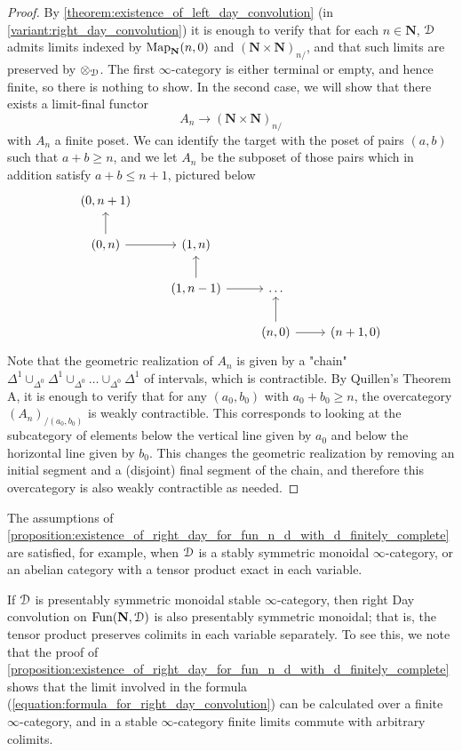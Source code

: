 \documentclass[oneside,a4paper]{amsart}
\begin{document}
\begin{proof}
By \cref{theorem:existence_of_left_day_convolution} (in \cref{variant:right_day_convolution}) it is enough to verify that for each $n \in \mathbf{N}$, $\EuScript{D}$ admits limits indexed by $\mathrm{Map}_{\mathbf{N}}(n, 0)$ and $(\mathbf{N} \times \mathbf{N})_{n / }$, and that such limits are preserved by $\otimes_{\EuScript{D}}$. The first $\infty$-category is either terminal or empty, and hence finite, so there is nothing to show. In the second case, we will show that there exists a limit-final functor 
\[
A_{n} \rightarrow (\mathbf{N} \times \mathbf{N})_{n / }
\]
with $A_{n}$ a finite poset. We can identify the target with the poset of pairs $(a, b)$ such that $a+b \geq n$, and we let $A_{n}$ be the subposet of those pairs which in addition satisfy $a+b \leq n+1$, pictured below 
\[
\begin{tikzcd}
	{(0, n+1)} &&& \\
	{(0, n)} & {(1, n)} \\
	& {(1, n-1)} & \ldots \\
	&& {(n, 0)} & {(n+1, 0)}
	\arrow[from=2-1, to=1-1]
	\arrow[from=2-1, to=2-2]
	\arrow[from=3-2, to=2-2]
	\arrow[from=3-2, to=3-3]
	\arrow[from=4-3, to=3-3]
	\arrow[from=4-3, to=4-4]
\end{tikzcd}
\]
Note that the geometric realization of $A_{n}$ is given by a "chain" $\Delta^{1} \cup_{\Delta^{0}} \Delta^{1} \cup_{\Delta^{0}} \ldots \cup_{\Delta^{0}} \Delta^{1}$ of intervals, which is contractible. By Quillen's Theorem A, it is enough to verify that for any $(a_{0}, b_{0})$ with $a_{0} + b_{0} \geq n$, the overcategory $(A_{n})_{/ (a_{0}, b_{0})}$ is weakly contractible. This corresponds to looking at the subcategory of elements below the vertical line given by $a_{0}$ and below the horizontal line given by $b_{0}$. This changes the geometric realization by removing an initial segment and a (disjoint) final segment of the chain, and therefore this overcategory is also weakly contractible as needed.  
\end{proof}

\begin{example}
The assumptions of \cref{proposition:existence_of_right_day_for_fun_n_d_with_d_finitely_complete} are satisfied, for example, when $\EuScript{D}$ is a stably symmetric monoidal $\infty$-category, or an abelian category with a tensor product exact in each variable. 
\end{example}

\begin{remark}
\label{remark:for_stable_presentable_d_right_day_on_fun_n_d_is_presentable}
If $\EuScript{D}$ is presentably symmetric monoidal stable $\infty$-category, then right Day convolution on $\mathrm{Fun}(\mathbf{N}, \EuScript{D})$ is also presentably symmetric monoidal; that is, the tensor product preserves colimits in each variable separately. To see this, we note that the proof of 
\cref{proposition:existence_of_right_day_for_fun_n_d_with_d_finitely_complete} shows that the limit involved in the formula (\ref{equation:formula_for_right_day_convolution}) can be calculated over a finite $\infty$-category, and in a stable $\infty$-category finite limits commute with arbitrary colimits. 
\end{remark}
\end{document}
